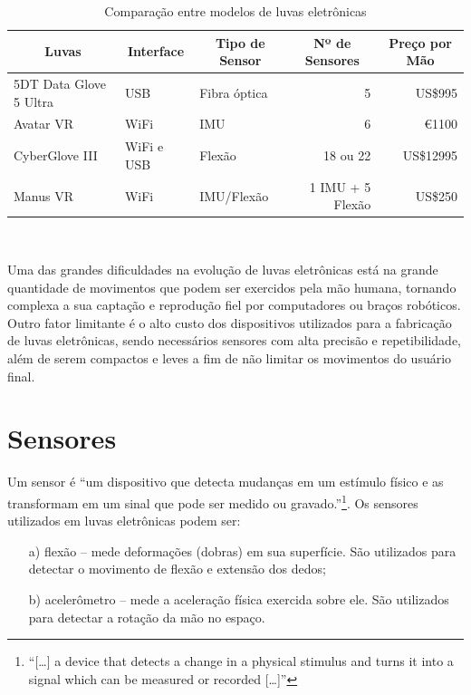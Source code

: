 \begin{table}[H]
    \centering
    \footnotesize
    \setlength{\abovecaptionskip}{0pt}
    \setlength{\belowcaptionskip}{0pt}
    \caption[Comparação entre modelos de luvas eletrônicas]{Comparação entre modelos de luvas eletrônicas}
    \label{tab:comp}
    \begin{tabularx}{\textwidth}{p{3.7cm}XXrr}
      \hline\hline
      \multicolumn{1}{c}{Luvas} & \multicolumn{1}{c}{Interface} & \multicolumn{1}{c}{Tipo de Sensor} & \multicolumn{1}{c}{Nº de Sensores} & \multicolumn{1}{c}{Preço por Mão}\\
      \hline
      5DT Data Glove 5 Ultra    & USB                           & Fibra óptica                       & 5                                  & US\$995\\
      Avatar VR                 & WiFi                          & \ac{IMU}                           & 6                                  & \euro{1100}\\
      CyberGlove III            & WiFi e USB                    & Flexão                             & 18 ou 22                           & US\$12995\\
      Manus VR                  & WiFi                          & \ac{IMU}/Flexão                    & 1 \ac{IMU} + 5 Flexão              & US\$250\\
      \hline \hline
    \end{tabularx}
    \\\vspace{1.3mm}
  \end{table}

Uma das grandes dificuldades na evolução de luvas eletrônicas está na grande quantidade de movimentos que podem ser exercidos pela mão humana, tornando complexa a sua captação e reprodução fiel por computadores ou braços robóticos. Outro fator limitante é o alto custo dos dispositivos utilizados para a fabricação de luvas eletrônicas, sendo necessários sensores com alta precisão e repetibilidade, além de serem compactos e leves a fim de não limitar os movimentos do usuário final.

\section{Sensores}
\label{sec:sens}
Um sensor é ``um dispositivo que detecta mudanças em um estímulo físico e as transformam em um sinal que pode ser medido ou gravado.''\cite{sensor}\footnote{``[\ldots] a device that detects a change in a physical stimulus and turns it into a signal which can be measured or recorded [\ldots]''}. Os sensores utilizados em luvas eletrônicas podem ser:
\begin{enumerate}
\item[a)] flexão -- mede deformações (dobras) em sua superfície. São utilizados para detectar o movimento de flexão e extensão dos dedos;
\item[b)] acelerômetro -- mede a aceleração física exercida sobre ele. São utilizados para detectar a rotação da mão no espaço.
\end{enumerate}

